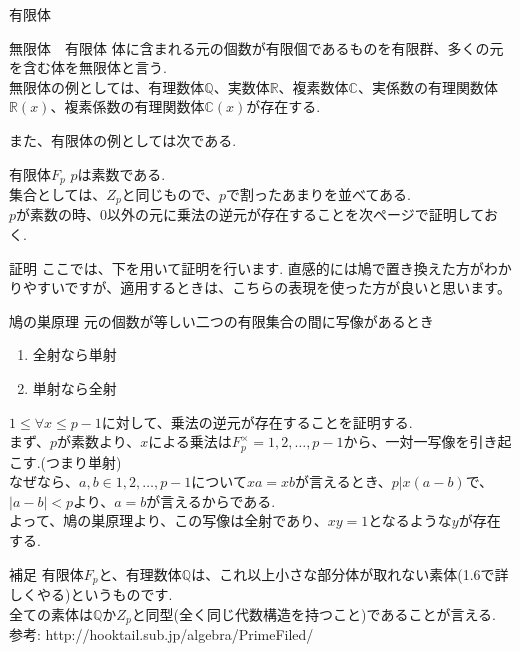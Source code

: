 \documentclass[dvipdfmx,11pt,notheorems]{beamer}
\begin{document}
\begin{frame}{有限体}
  \begin{block}{無限体　有限体}
    体に含まれる元の個数が有限個であるものを\alert{有限群}、多くの元を含む体を\alert{無限体}と言う. \\
    無限体の例としては、有理数体$\mathbb{Q}$、実数体$\mathbb{R}$、複素数体$\mathbb{C}$、実係数の有理関数体$\mathbb{R}(x)$、複素係数の有理関数体$\mathbb{C}(x)$が存在する.
  \end{block}
  また、有限体の例としては次である.
  \begin{exampleblock}{有限体$F_p$}
    $p$は素数である.\\
    集合としては、$Z_p$と同じもので、$p$で割ったあまりを並べてある.\\
    $p$が素数の時、$0$以外の元に乗法の逆元が存在することを次ページで証明しておく.
  \end{exampleblock}
\end{frame}

\begin{frame}{証明}
  ここでは、下を用いて証明を行います. 直感的には鳩で置き換えた方がわかりやすいですが、適用するときは、こちらの表現を使った方が良いと思います。
  \begin{alertblock}{鳩の巣原理}
    元の個数が等しい二つの有限集合の間に写像があるとき
    \begin{enumerate}
      \item 全射なら単射
      \item 単射なら全射
    \end{enumerate}
  \end{alertblock}
  $1 \le \forall x \le p-1$に対して、乗法の逆元が存在することを証明する.\\
  まず、$p$が素数より、$x$による乗法は$F_p^\times = {1,2,\ldots,p-1}$から、一対一写像を引き起こす.(つまり単射)\\
  なぜなら、$a,b\in {1,2,\ldots,p-1}$について$xa=xb$が言えるとき、$p|x(a-b)$で、$|a-b|<p$より、$a=b$が言えるからである.\\

  よって、鳩の巣原理より、この写像は全射であり、$xy=1$となるような$y$が存在する.
\end{frame}
\begin{frame}{補足}
  有限体$F_p$と、有理数体$\mathbb{Q}$は、これ以上小さな部分体が取れない\alert{素体}(1.6で詳しくやる)というものです.\\
  全ての素体は$\mathbb{Q}$か$Z_p$と同型(全く同じ代数構造を持つこと)であることが言える.\\
  参考: http://hooktail.sub.jp/algebra/PrimeFiled/
\end{frame}
\end{document}
